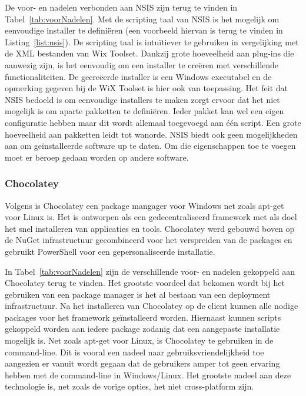 De voor- en nadelen verbonden aan NSIS zijn terug te vinden in Tabel~\ref{tab:voorNadelen}.
Met de scripting taal van NSIS is het mogelijk om eenvoudige installer te definiëren (een voorbeeld hiervan is terug te vinden in Listing~\vref{list:nsis}).
De scripting taal is intuïtiever te gebruiken in vergelijking met de XML bestanden van Wix Toolset.
Dankzij grote hoeveelheid aan plug-ins die aanwezig zijn, is het eenvoudig om een installer te creëren met verschillende functionaliteiten.
De gecreëerde installer is een Windows executabel en de opmerking gegeven bij de WiX Toolset is hier ook van toepassing.
Het feit dat NSIS bedoeld is om eenvoudige installers te maken zorgt ervoor dat het niet mogelijk is om aparte pakketten te definiëren.
Ieder pakket kan wel een eigen configuratie hebben maar dit wordt allemaal toegevoegd aan één script.
Een grote hoeveelheid aan pakketten leidt tot wanorde.
NSIS biedt ook geen mogelijkheden aan om geïnstalleerde software up te daten.
Om die eigenschappen toe te voegen moet er beroep gedaan worden op andere software.

\subsubsection{Chocolatey}
Volgens \citep{chocoAbout} is Chocolatey een package mangager voor Windows net zoals apt-get voor Linux is.
Het is ontworpen als een gedecentraliseerd framework met als doel het snel installeren van applicaties en tools.
Chocolatey werd gebouwd boven op de NuGet infrastructuur gecombineerd voor het verspreiden van de packages en gebruikt PowerShell voor een gepersonaliseerde installatie.

In Tabel~\ref{tab:voorNadelen} zijn de verschillende voor- en nadelen gekoppeld aan Chocolatey terug te vinden.
Het grootste voordeel dat bekomen wordt bij het gebruiken van een package manager is het al bestaan van een deployment infrastructuur. 
Na het installeren van Chocolatey op de client kunnen alle nodige packages voor het framework geïnstalleerd worden.
Hiernaast kunnen scripts gekoppeld worden aan iedere package zodanig dat een aangepaste installatie mogelijk is.
Net zoals apt-get voor Linux, is Chocolatey te gebruiken in de command-line.
Dit is vooral een nadeel naar gebruiksvriendelijkheid toe aangezien er vanuit wordt gegaan dat de gebruikers amper tot geen ervaring hebben met de command-line in Windows/Linux.
Het grootste nadeel aan deze technologie is, net zoals de vorige opties, het niet cross-platform zijn.

